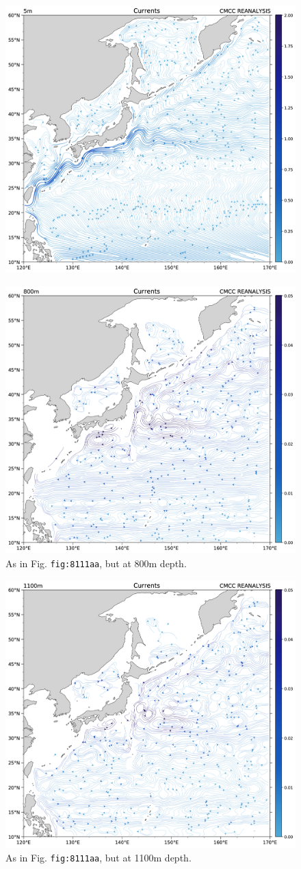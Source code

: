 \begin{figure}
\centering
\includegraphics[width = .7 \textwidth]{figs/GD/UVstream5mKur.png}
\caption{} \label{fig:}
\end{figure}

\begin{figure}
\centering
\includegraphics[width = .7 \textwidth]{figs/GD/UVstream800mKUR.png}
\caption{As in Fig. \texttt{fig:8111aa}, but at 800m depth.}
\end{figure}

\begin{figure}
\centering
\includegraphics[width = .7 \textwidth]{figs/GD/UVstream1100mKUR.png}
\caption{As in Fig. \texttt{fig:8111aa}, but at 1100m depth.}
\end{figure}

